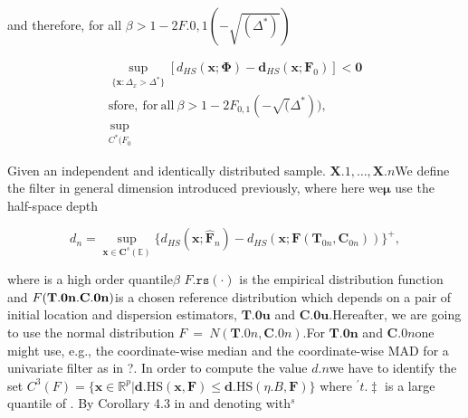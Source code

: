 \documentclass{article}
\begin{document}
and therefore, for all $\beta > 1 - 2 F . { 0, 1 } ( - \sqrt { ( \Delta ^ { * } ) } )$


\begin{equation}
\begin{array} { c } { \operatorname* { s u p } _ { \{ \mathbf { x } : \Delta _ { x } > \Delta ^ { * } \} } \left [ d _ { H S } ( \mathbf { x } ; \mathbf { \Phi } ) - \mathbf { d } _ { H S } ( \mathbf { x } ; \mathbf { F } _ { 0 } ) \right ] < \mathbf { 0 } } \\ { \mathrm { s f o r e, ~ f o r ~ a l l ~ } \beta > 1 - 2 F _ { 0, 1 } ( - \sqrt ( \Delta ^ { * } ) ), } \\ { \operatorname* { s u p } _ { C ^ { * } ( F _ { 0}}}\end{array}
\end{equation}


Given an independent and identically distributed sample. $\mathbf { X } . { 1 }, \dots, \mathbf { X } . { n }$We
define the filter in general dimension introduced previously, where here we$\boldsymbol { \mu }$
use the half-space depth


\begin{equation}
d _ { n } = \operatorname* { s u p } _ { \mathbf { x } \in \mathbf { C } ^ { s } ( \mathbb { E } ) } \{ d _ { H S } ( \mathbf { x } ; \hat { \mathbf { F } } _ { n } ) - d _ { H S } ( \mathbf { x } ; \mathbf { F } ( \mathbf { T } _ { 0 n }, \mathbf { C } _ { 0 n } ) ) \} ^ { + },
\end{equation}


where  is a high order quantile$\beta$ $F . { \mathtt { r s } } ( \cdot )$ is the empirical distribution function
and $F ( \bf T . { 0 n }. C . { 0 n } )$is a chosen reference distribution which depends on a pair
of initial location and dispersion estimators, $\mathbf { T . { 0 u } }$ and $\mathbf { C . { 0 u } }$.Hereafter, we
are going to use the normal distribution $F ~ = ~ N ( \mathbf { T } . { 0 n }, \mathbf { C } . { 0 n } )$.For $\mathbf { T . { 0 n } }$ and
${ \mathbf { C } . { 0 n } }$one might use, e.g., the coordinate-wise median and the coordinate-wise
MAD for a univariate filter as in ?. In order to compute the value $d . { n }$we
have to identify the set $C ^ { 3 } ( F ) = \{ \mathbf { x } \in \mathbb { R } ^ { p } | \mathbf { d } . { \mathrm { H S } } ( \mathbf { x }, \mathbf { F } ) \leq \mathbf { d } . { \mathrm { H S } } ( \eta . { B }, \mathbf { F } ) \}$ where
$^ { \prime } t. \ddag$ is a large quantile of . By Corollary 4.3 in and denoting with$^ { s }$
\end{document}
